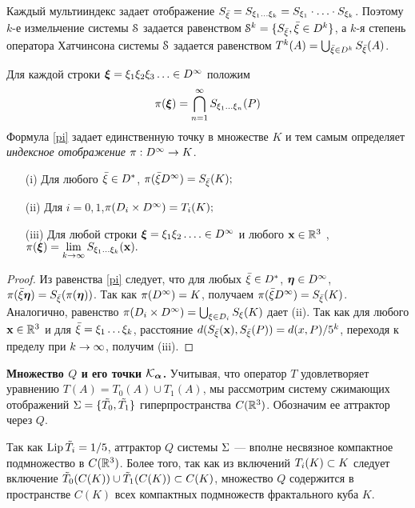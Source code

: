 Каждый мультииндекс задает отображение $S_{\bar{\xi}}=S_{\xi_1\ldots\xi_k}=S_{\xi_1}\cdot\ldots\cdot S_{\xi_k}$. 
Поэтому $k$-е измельчение системы ${\EuScript S}$ задается равенством ${\EuScript S}^k=\{S_{\bar{\xi}}, {\bar{\xi}}\in  D^k\}$, а $k$-я степень оператора Хатчинсона системы ${\EuScript S}$ задается равенством $T^k(A)=\bigcup_{{\bar{\xi}}\in D^k}S_{\bar{\xi}}(A)$.


Для каждой строки ${\bm{\xi}}=\xi_1\xi_2\xi_3\ldots\in  D^\infty$ положим
\begin{equation}\label{pi}
\pi({\bm{\xi}})=\bigcap\limits_{n=1}^\infty S_{\xi_1\ldots\xi_n}(P)
\end{equation}
Формула \eqref{pi} задает единственную точку в множестве $K$ и тем самым определяет {\em индексное отображение} $\pi:D^\infty\to K$.
\begin{lemma} \label{piD}
\begin{itemize}[nolistsep]
\item[{\rm (i)}] Для любого ${\bar{\xi}}\in D^*$, $\pi({\bar{\xi}} D^\infty)=S_{\bar{\xi}}(K);$
\item[{\rm (ii)}] Для $i=0,1$,\quad $\pi(D_i\times D^\infty)=T_i(K);$
\item[{\rm (iii)}] Для любой строки ${\bm{\xi}}=\xi_1\xi_2\ldots.\in D^\infty$ и  любого ${\bf{x}}\in\mathbb{R}^3$ , $\pi({\bm{\xi}})=\lim\limits_{k\to\infty}S_{\xi_1\ldots\xi_k}({\bf{x}}).$ 
\end{itemize}
\end{lemma}

\begin{proof}
Из равенства \eqref{pi} следует, что для любых ${\bar{\xi}}\in D^*$, ${\bm{\eta}}\in D^\infty$, $\pi({\bar{\xi}} {\bm{\eta}})=S_{\bar{\xi}}(\pi({\bm{\eta}}))$. 
Так как $\pi(D^\infty)=K$, получаем $\pi({\bar{\xi}} D^\infty)=S_{\bar{\xi}}(K)$.  
Аналогично, равенство $\pi(D_i\times D^\infty)=\bigcup_{\xi\in D_i}S_{\xi}(K)$ дает (ii). 
Так как для любого ${\bf{x}}\in\mathbb{R}^3$   и для  ${\bar{\xi}}=\xi_1\ldots\xi_k$, расстояние $d(S_{\bar{\xi}}({\bf{x}}),S_{\bar{\xi}}(P))=d(x,P)/5^k $, переходя к пределу при $k\to\infty$, получим (iii).
\end{proof}
  

{\bf Множество $Q$ и его точки ${\mathcal K}_{\bm{\alpha}}$.}
Учитывая, что оператор $T$ удовлетворяет уравнению $T(A)=T_0(A)\cup T_1(A)$, мы рассмотрим систему сжимающих отображений $\Sigma=\{ \tilde{T_0},\tilde{T_1}\}$ гиперпространства $C(\mathbb{R}^3)$. 
Обозначим ее аттрактор через $Q$.

Так как $\mathop{\rm Lip} \nolimits{\tilde T_i}=1/5$, аттрактор $Q$ системы $\Sigma$ --- вполне несвязное компактное подмножество в $C(\mathbb{R}^3)$. 
Более того, так как из включений $T_i(K)\subset K$ следует включение ${\tilde T}_0(C(K))\cup {\tilde T}_1(C(K))\subset C(K)$, множество $Q$ содержится в пространстве  $C(K)$ всех компактных подмножеств фрактального куба $K$.

